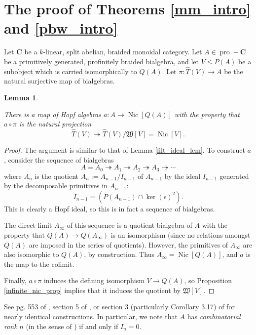 \documentclass[12pt]{article}
\DeclareMathOperator{\Nic}{Nic}
\DeclareMathOperator{\pro}{pro}
\newcommand{\That}{\widehat{T}}
\newcommand{\bC} {\mathbf{C}}
\newcommand{\proC}{\pro\!-\bC}
\newcommand{\mW}{\mathfrak{W}}
\theoremstyle{plain}
\newtheorem{lem}[thm]{Lemma}
\theoremstyle{definition}
\theoremstyle{remark}
\begin{document}
\section{The proof of Theorems \ref{mm_intro} and \ref{pbw_intro}} \label{W_axioms_section}

Let $\bC$ be a $k$-linear, split abelian, braided monoidal category.  Let $A \in \proC$ be a primitively generated, profinitely braided bialgebra, and let $V \leq P(A)$ be a subobject which is carried isomorphically to $Q(A)$.  Let $\pi: \That(V) \to A$ be the natural surjective map of bialgebras.

\begin{lem} \label{factor_lem}

There is a map of Hopf algebras $a: A \to \Nic[Q(A)]$ with the property that $a \circ \pi$ is the natural projection
%
$$\That(V) \twoheadrightarrow \That(V)/\mW[V] = \Nic[V].$$

\end{lem}

\begin{proof}

The argument is similar to that of Lemma \ref{filt_ideal_lem}.  To construct $a$, consider the sequence of bialgebras
%
$$A = A_0 \twoheadrightarrow A_1 \twoheadrightarrow A_2 \twoheadrightarrow A_3 \twoheadrightarrow \cdots$$
%
where $A_n$ is the quotient $A_n := A_{n-1} / I_{n-1}$ of $A_{n-1}$ by the ideal $I_{n-1}$ generated by the decomposable primitives in $A_{n-1}$: 
%
$$I_{n-1} = (P(A_{n-1}) \cap \ker(\epsilon)^2).$$
%
This is clearly a Hopf ideal, so this is in fact a sequence of bialgebras.  

The direct limit $A_\infty$ of this sequence is a quotient bialgebra of $A$ with the property that $Q(A) \to Q(A_{\infty})$ is an isomorphism (since no relations amongst $Q(A)$ are imposed in the series of quotients).  However, the primitives of $A_\infty$ are also isomorphic to $Q(A)$, by construction.  Thus $A_\infty = \Nic[Q(A)]$, and $a$ is the map to the colimit.  

Finally, $a \circ \pi$ induces the defining isomorphism $V \to Q(A)$, so Proposition \ref{infinite_nic_prop} implies that it induces the quotient by $\mW[V]$.

\end{proof}

See pg. 553 of \cite{kharchenko_skew}, section 5 of \cite{ardizzoni_mm}, or section 3 (particularly Corollary 3.17) of \cite{ardizzoni_comb} for nearly identical constructions.  In particular, we note that $A$ has \emph{combinatorial rank} $n$ (in the sense of \cite{kharchenko_comb}) if and only if $I_n=0$.
\end{document}
